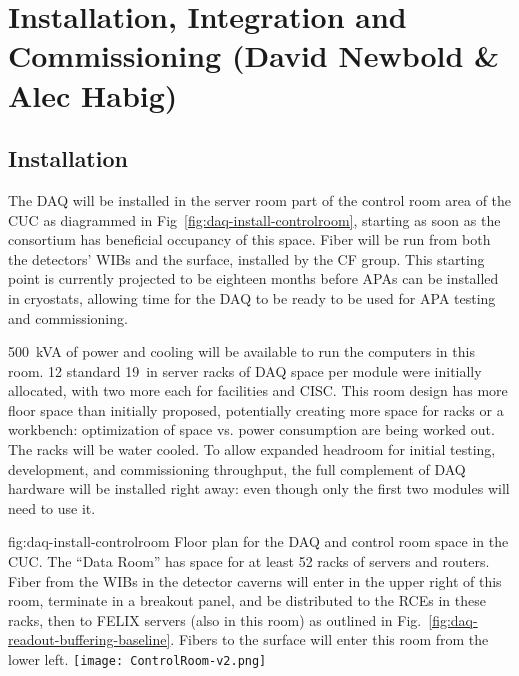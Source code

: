 
\section{Installation, Integration and Commissioning (David Newbold \& Alec Habig)}
\label{sec:fdsp-daq-install}


\subsection{Installation}
\label{sec:fdsp-daq-install-transport}

The DAQ will be installed in the server room part of the control room
area of the CUC as diagrammed in Fig~\ref{fig:daq-install-controlroom},
starting as soon as the consortium has beneficial occupancy of this
space.  Fiber will be run from both the detectors' WIBs and the surface,
installed by the CF group.  This starting point is currently projected
to be eighteen months before APAs can be installed in cryostats,
allowing time for the DAQ to be ready to be used for APA testing and
commissioning.

\SI{500}{kVA} of power and cooling will be available to run the
computers in this room.  12 standard \SI{19}{in} server racks of DAQ
space per module were initially allocated, with two more each for
facilities and CISC.  This room design has more floor space than
initially proposed, potentially creating more space for racks or a
workbench: optimization of space vs. power consumption are being worked
out.  The racks will be water cooled. To allow expanded headroom for
initial testing, development, and commissioning throughput, the full
complement of DAQ hardware will be installed right away: even though
only the first two modules will need to use it.

\begin{dunefigure}{fig:daq-install-controlroom}
  {Floor plan for the DAQ and control room space in the CUC.  The ``Data
    Room'' has space for at least 52 racks of servers and routers.
    Fiber from the WIBs in the detector caverns will enter in the upper
    right of this room, terminate in a breakout panel, and be
    distributed to the RCEs in these racks, then to FELIX servers (also
    in this room) as outlined in
    Fig.~\ref{fig:daq-readout-buffering-baseline}.  Fibers to the
    surface will enter this room from the lower left.}
\texttt{[image: ControlRoom-v2.png]}
\end{dunefigure}

